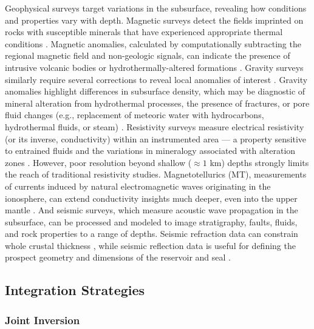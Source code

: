 Geophysical surveys target variations in the subsurface, revealing how conditions and properties vary with depth. Magnetic surveys detect the fields imprinted on rocks with susceptible minerals that have experienced appropriate thermal conditions \citep[p.\ 248-249]{lowrie_fundamentals_2007}. Magnetic anomalies, calculated by computationally subtracting the regional magnetic field and non-geologic signals, can indicate the presence of intrusive volcanic bodies or hydrothermally-altered formations \citep[p.\ 146]{glassley_geothermal_2015}. Gravity surveys similarly require several corrections to reveal local anomalies of interest \citep[p.\ 59-62]{lowrie_fundamentals_2007}. Gravity anomalies highlight differences in subsurface density, which may be diagnostic of mineral alteration from hydrothermal processes, the presence of fractures, or pore fluid changes (e.g., replacement of meteoric water with hydrocarbons, hydrothermal fluids, or steam) \citep[p.\ 150]{glassley_geothermal_2015}. Resistivity surveys measure electrical resistivity (or its inverse, conductivity) within an instrumented area --– a property sensitive to entrained fluids and the variations in mineralogy associated with alteration zones \citep[p.\ 147]{glassley_geothermal_2015}. However, poor resolution beyond shallow ($\approx1$ km) depths strongly limits the reach of traditional resistivity studies. Magnetotellurics (MT), measurements of currents induced by natural electromagnetic waves originating in the ionosphere, can extend conductivity insights much deeper, even into the upper mantle \citep[p.\ 225]{lowrie_fundamentals_2007}. And seismic surveys, which measure acoustic wave propagation in the subsurface, can be processed and modeled to image stratigraphy, faults, fluids, and rock properties to a range of depths. Seismic refraction data can constrain whole crustal thickness \citep[e.g.,][]{holmes_oceanic_2009}, while seismic reflection data is useful for defining the prospect geometry and dimensions of the reservoir and seal \citep[e.g.,][]{cappetti_new_2005}.

\subsection{Integration Strategies}\label{ch2:integration_strategies}

\subsubsection{Joint Inversion}\label{ch2:joint_invert}

